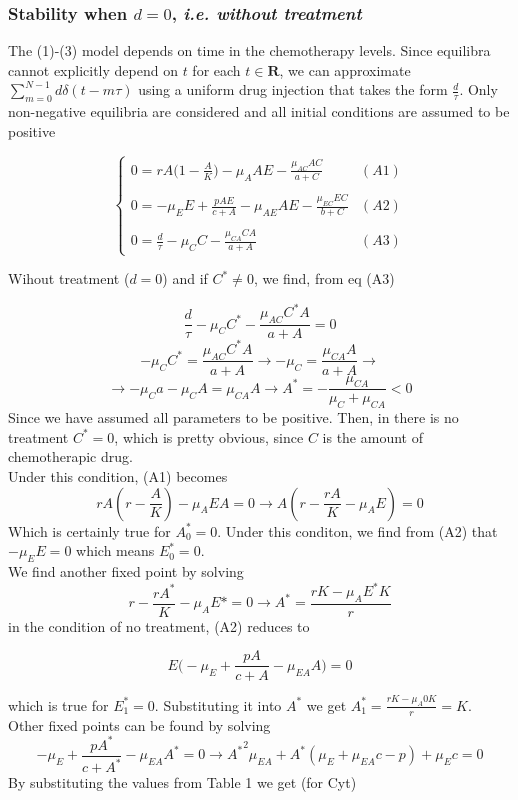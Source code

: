 \subsubsection{Stability when $d=0$, \textit{i.e. without treatment}}
The (1)-(3) model depends on time in the chemotherapy levels. Since equilibra cannot explicitly depend on $t$ for each $t\in \mathbf{R}$, we can approximate $\sum_{m=0}^{N-1} d\delta(t - m\tau)$ using a uniform drug injection that takes the form $\frac{d}{\tau}$. Only non-negative equilibria are considered and all initial conditions are assumed to be positive

\[
	\begin{cases}
	0 = rA \bigl( 1 - \frac{A}{K} \bigr) - \mu_A AE - \frac{\mu_{AC} AC}{a+C} & (A1)\\ \\ 
	0 = -\mu_E E + \frac{pAE}{c+A} - \mu_{AE} AE - \frac{\mu_{EC} EC}{b+C} & (A2) \\ \\
	0 = \frac{d}{\tau} - \mu_CC - \frac{\mu_{CA} CA}{a+A} & (A3) 
	\end{cases} 
\]

Wihout treatment ($d=0$) and if $C^* \neq 0$, we find, from eq (A3)

\[
	\frac{d}{\tau} - \mu_C C^* - \frac{\mu_{AC}C^* A}{a+A} = 0 \]
\[- \mu_C C^* = \frac{\mu_{AC}C^* A}{a+A} \rightarrow -\mu_C = \frac{\mu_{CA} A}{a+A} \rightarrow\]
\[\rightarrow -\mu_Ca - \mu_CA = \mu_{CA} A \rightarrow A^* = -\frac{\mu_{CA}}{\mu_C + \mu_{CA}} < 0\]
Since we have assumed all parameters to be positive. Then, in there is no treatment $C^*=0$, which is pretty obvious, since $C$ is the amount of chemotherapic drug.\\
Under this condition, (A1) becomes
\[ rA \left( r - \frac{A}{K} \right) - \mu_A EA = 0 \rightarrow A \left( r - \frac{rA}{K} - \mu_A E \right) = 0 \]
Which is certainly true for $A_0^*=0$. Under this conditon, we find from (A2) that $-\mu_E E = 0$ which means $E_0^*=0$.\\
We find another fixed point by solving
\[ r - \frac{rA^*}{K} - \mu_A E* = 0 \rightarrow A^* = \frac{rK-\mu_AE^*K}{r} \]
in the condition of no treatment, (A2) reduces to

\[ E\bigl( -\mu_E + \frac{pA}{c+A} - \mu_{EA} A \bigr) = 0 \]

which is true for $E_1^*=0$. Substituting it into $A^*$ we get $A_1^* = \frac{rK - \mu_A 0 K}{r} = K$.\\
Other fixed points can be found by solving
\[ -\mu_E + \frac{pA^*}{c+A^*} - \mu_{EA} A^* = 0 \rightarrow {A^*}^2 \mu_{EA} + A^* (\mu_E + \mu_{EA}c - p) + \mu_Ec = 0 \]
By substituting the values from Table 1 we get (for Cyt)

